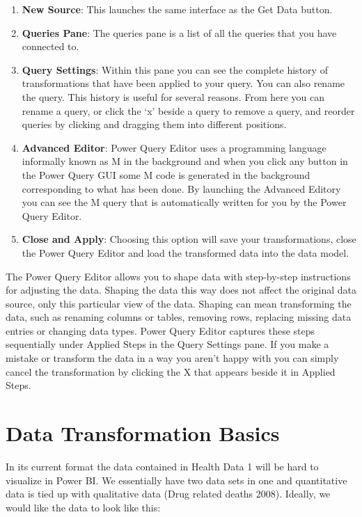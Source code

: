 \documentclass[
]{book}
\begin{document}
\begin{enumerate}
\def\labelenumi{\arabic{enumi}.}
\item
  \textbf{New Source}: This launches the same interface as the Get Data button.
\item
  \textbf{Queries Pane}: The queries pane is a list of all the queries that you have connected to.
\item
  \textbf{Query Settings}: Within this pane you can see the complete history of transformations that have been applied to your query. You can also rename the query. This history is useful for several reasons. From here you can rename a query, or click the `x' beside a query to remove a query, and reorder queries by clicking and dragging them into different positions.
\item
  \textbf{Advanced Editor}: Power Query Editor uses a programming language informally known as M in the background and when you click any button in the Power Query GUI some M code is generated in the background corresponding to what has been done. By launching the Advanced Editory you can see the M query that is automatically written for you by the Power Query Editor.
\item
  \textbf{Close and Apply}: Choosing this option will save your transformations, close the Power Query Editor and load the transformed data into the data model.
\end{enumerate}

The Power Query Editor allows you to shape data with step-by-step instructions for adjusting the data. Shaping the data this way does not affect the original data source, only this particular view of the data. Shaping can mean transforming the data, such as renaming columns or tables, removing rows, replacing missing data entries or changing data types. Power Query Editor captures these steps sequentially under Applied Steps in the Query Settings pane. If you make a mistake or transform the data in a way you aren't happy with you can simply cancel the transformation by clicking the X that appears beside it in Applied Steps.

\hypertarget{data-transformation-basics}{%
\section{Data Transformation Basics}\label{data-transformation-basics}}

In its current format the data contained in Health Data 1 will be hard to visualize in Power BI. We essentially have two data sets in one and quantitative data is tied up with qualitative data (Drug related deaths 2008). Ideally, we would like the data to look like this:
\end{document}
